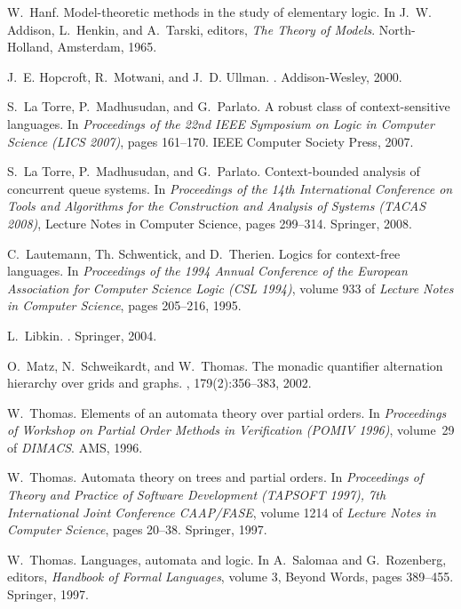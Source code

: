 \documentclass{LMCS}
\begin{document}
\begin{thebibliography}{10}
W.~Hanf.
\newblock Model-theoretic methods in the study of elementary logic.
\newblock In J.~W. Addison, L.~Henkin, and A.~Tarski, editors, {\em The Theory
  of Models}. North-Holland, Amsterdam, 1965.

J.~E. Hopcroft, R.~Motwani, and J.~D. Ullman.
.
\newblock Addison-Wesley, 2000.

S.~{La Torre}, P.~Madhusudan, and G.~Parlato.
\newblock A robust class of context-sensitive languages.
\newblock In {\em Proceedings of the 22nd IEEE Symposium on Logic in Computer
  Science (LICS 2007)}, pages 161--170. IEEE Computer Society Press, 2007.

S.~{La Torre}, P.~Madhusudan, and G.~Parlato.
\newblock Context-bounded analysis of concurrent queue systems.
\newblock In {\em Proceedings of the 14th International Conference on Tools and
  Algorithms for the Construction and Analysis of Systems (TACAS 2008)},
  Lecture Notes in Computer Science, pages 299--314. Springer, 2008.

C.~Lautemann, Th. Schwentick, and D.~Therien.
\newblock Logics for context-free languages.
\newblock In {\em {Proceedings of the 1994 Annual Conference of the European
  Association for Computer Science Logic (CSL 1994)}}, volume 933 of {\em
  Lecture Notes in Computer Science}, pages 205--216, 1995.

L.~Libkin.
.
\newblock Springer, 2004.

O.~Matz, N.~Schweikardt, and W.~Thomas.
\newblock The monadic quantifier alternation hierarchy over grids and graphs.
, 179(2):356--383, 2002.

W.~Thomas.
\newblock Elements of an automata theory over partial orders.
\newblock In {\em Proceedings of Workshop on Partial Order Methods in
  Verification (POMIV 1996)}, volume~29 of {\em DIMACS}. AMS, 1996.

W.~Thomas.
\newblock Automata theory on trees and partial orders.
\newblock In {\em Proceedings of Theory and Practice of Software Development
  (TAPSOFT 1997), 7th International Joint Conference CAAP/FASE}, volume 1214 of
  {\em Lecture Notes in Computer Science}, pages 20--38. Springer, 1997.

W.~Thomas.
\newblock Languages, automata and logic.
\newblock In A.~Salomaa and G.~Rozenberg, editors, {\em Handbook of Formal
  Languages}, volume 3, Beyond Words, pages 389--455. Springer, 1997.

\end{thebibliography}
\end{document}
